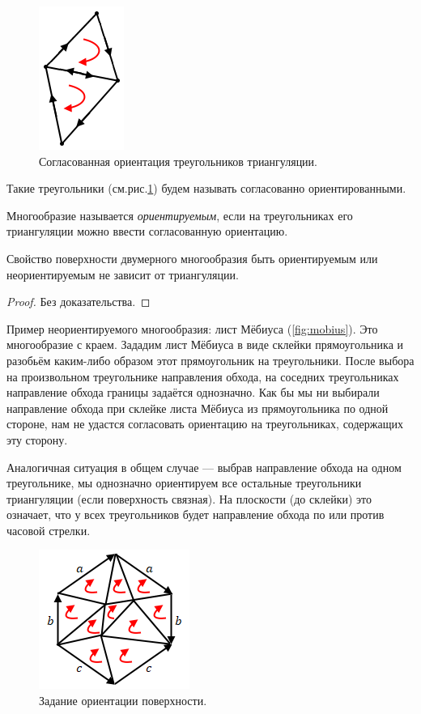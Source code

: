 \begin{figure}[htbp]
    \centering
    \includegraphics[scale=0.7]{images/c11.2.png}
    \caption{Согласованная ориентация треугольников триангуляции.}
    \label{fig:c11.2}
\end{figure}

Такие треугольники (см.рис.\ref{fig:c11.2}) будем называть согласованно ориентированными.

\begin{definition}
    Многообразие называется \textit{ориентируемым}, если на треугольниках его триангуляции можно ввести согласованную ориентацию.
\end{definition} 

\begin{statement}
    Свойство поверхности двумерного многообразия быть ориентируемым или неориентируемым не зависит от триангуляции.
\end{statement} 
\begin{proof}
    Без доказательства.
\end{proof} 

Пример неориентируемого многообразия: лист Мёбиуса (\ref{fig:mobius}). Это многообразие с краем. Зададим лист Мёбиуса в виде склейки прямоугольника и разобьём каким-либо образом этот прямоугольник на треугольники. После выбора на произвольном треугольнике направления обхода, на соседних треугольниках направление обхода границы задаётся однозначно. Как бы мы ни выбирали направление обхода при склейке листа Мёбиуса из прямоугольника по одной стороне, нам не удастся согласовать ориентацию на треугольниках, содержащих эту сторону.

Аналогичная ситуация в общем случае — выбрав направление обхода на одном треугольнике, мы однозначно ориентируем все остальные треугольники триангуляции (если поверхность связная). На плоскости (до склейки) это означает, что у всех треугольников будет направление обхода по или против часовой стрелки.

\begin{figure}[htbp]
    \centering
    \includegraphics[scale=0.7]{images/c11.3.png}
    \caption{Задание ориентации поверхности.}
    \label{fig:c11.3}
\end{figure}


